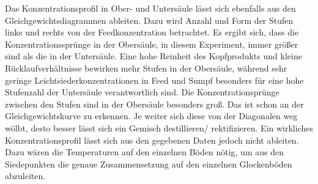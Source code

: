 \begin{table}[h!]
	\centering
	\caption{Vergleich der Ergebnisse aus händischer Berechnung zu den Ergebnissen des Programms VLE}
	\label{tab:Vergleich}
\end{table}
\FloatBarrier
\vspace*{-2.5mm}
Das Konzentrationsprofil in Ober- und Untersäule lässt sich ebenfalls aus den Gleichgewichtsdiagrammen ableiten. Dazu wird Anzahl und Form der Stufen links und rechts von der Feedkonzentration betrachtet. Es ergibt sich, dass die Konzentrationssprünge in der Obersäule, in diesem Experiment, immer größer sind als die in der Untersäule. Eine hohe Reinheit des Kopfprodukts und kleine Rücklaufverhältnisse bewirken mehr Stufen in der Obersäule, während sehr geringe Leichtsiederkonzentrationen in Feed und Sumpf besonders für eine hohe Stufenzahl der Untersäule verantwortlich sind. Die Konzentrationsprünge zwischen den Stufen sind in der Obersäule besonders groß. Das ist schon an der Gleichgewichtskurve zu erkennen. Je weiter sich diese von der Diagonalen weg wölbt, desto besser lässt sich ein Gemisch destillieren/ rektifizieren. Ein wirkliches Konzentrationsprofil lässt sich aus den gegebenen Daten jedoch nicht ableiten. Dazu wären die Temperaturen auf den einzelnen Böden nötig, um aus den Siedepunkten die genaue Zusammensetzung auf den einzelnen Glockenböden abzuleiten.

